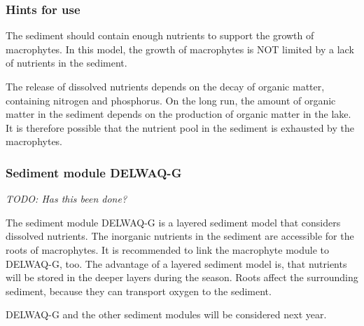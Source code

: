 \subsubsection*{Hints for use}
The sediment should contain enough nutrients to support the growth of macrophytes. In this model, the growth
of macrophytes is NOT limited by a lack of nutrients in the sediment.

The release of dissolved nutrients depends on the decay of organic matter, containing nitrogen and
phosphorus. On the long run, the amount of organic matter in the sediment depends on the production
of organic matter in the lake. It is therefore possible that the nutrient pool in the sediment is
exhausted by the macrophytes.

\subsubsection{Sediment module DELWAQ-G}
\emph{TODO: Has this been done?}

The sediment module DELWAQ-G is a layered sediment model that considers dissolved nutrients. The
inorganic nutrients in the sediment are accessible for the roots of macrophytes. It is recommended
to link the macrophyte module to DELWAQ-G, too. The advantage of a layered sediment model is, that
nutrients will be stored in the deeper layers during the season. Roots affect the surrounding sediment,
because they can transport oxygen to the sediment.

DELWAQ-G and the other sediment modules will be considered next year.

